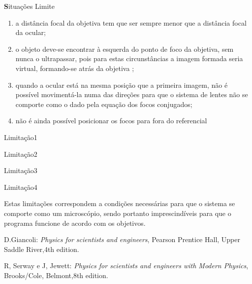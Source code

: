 \documentclass{article}
\begin{document}
\begin{multicols}{2}
{\LARGE\textbf Situações Limite}

\begin{enumerate}

\item a distância focal da objetiva tem que ser sempre menor que a distância focal da ocular;
\item o objeto deve-se encontrar à esquerda do ponto de foco da objetiva, sem nunca o ultrapassar, pois para estas circunstâncias a imagem formada seria virtual, formando-se atrás da objetiva ; 
\item quando a ocular está na mesma posição que a primeira imagem, não é possível movimentá-la numa das direções para que o sistema de lentes não se comporte como o dado pela equação dos focos conjugados;
\item não é ainda possível posicionar os focos para fora do referencial

\end{enumerate}

\begin{center}
\end{center}
\vskip -2mm\centerline{Limitação1}
\vskip 2mm


\begin{center}
\end{center}
\vskip -2mm\centerline{Limitação2}
\vskip 2mm

\begin{center}
\end{center}
\vskip -3mm\centerline{Limitação3}
\vskip 2mm


\begin{center}
\end{center}
\vskip -3mm\centerline{Limitação4}
\vskip 2mm

Estas limitações correspondem a condições necessárias para que o sistema se comporte como um microscópio, sendo portanto imprescindíveis para que o programa funcione de acordo com os objetivos.












\begin{thebibliography}{}

 D.Giancoli: 
\emph{Physics for scientists and engineers}, Pearson Prentice Hall, Upper Saddle River,4th edition.

 R, Serway e J, Jewett: 
\emph{Physics for scientists and engineers with Modern Physics}, Brooks/Cole, Belmont,8th edition.
\end{thebibliography}

\end{multicols}
\end{document}
